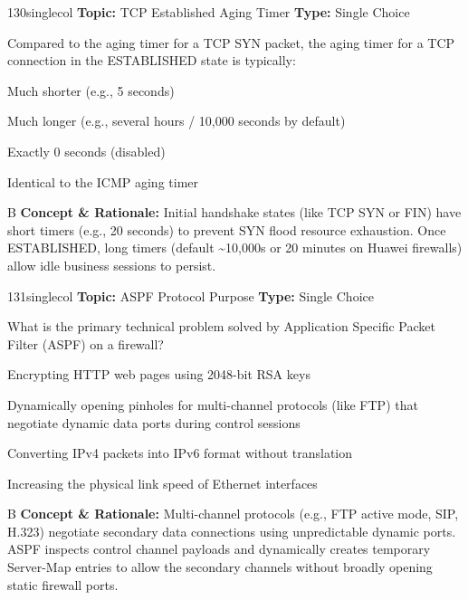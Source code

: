 \begin{qcard}{130}{singlecol}
\textcolor{darkslate!75}{\small\textbf{Topic:} TCP Established Aging Timer \hfill \textbf{Type:} Single Choice}\vspace{0.4em}\par
Compared to the aging timer for a TCP SYN packet, the aging timer for a TCP connection in the ESTABLISHED state is typically:
\begin{qoptions}
\item Much shorter (e.g., 5 seconds)
\item Much longer (e.g., several hours / 10,000 seconds by default)
\item Exactly 0 seconds (disabled)
\item Identical to the ICMP aging timer
\end{qoptions}
\end{qcard}
\nopagebreak
\begin{explainbox}{B}
\textbf{Concept \& Rationale:} Initial handshake states (like TCP SYN or FIN) have short timers (e.g., 20 seconds) to prevent SYN flood resource exhaustion. Once ESTABLISHED, long timers (default \textasciitilde{}10,000s or 20 minutes on Huawei firewalls) allow idle business sessions to persist.
\end{explainbox}

\begin{qcard}{131}{singlecol}
\textcolor{darkslate!75}{\small\textbf{Topic:} ASPF Protocol Purpose \hfill \textbf{Type:} Single Choice}\vspace{0.4em}\par
What is the primary technical problem solved by Application Specific Packet Filter (ASPF) on a firewall?
\begin{qoptions}
\item Encrypting HTTP web pages using 2048-bit RSA keys
\item Dynamically opening pinholes for multi-channel protocols (like FTP) that negotiate dynamic data ports during control sessions
\item Converting IPv4 packets into IPv6 format without translation
\item Increasing the physical link speed of Ethernet interfaces
\end{qoptions}
\end{qcard}
\nopagebreak
\begin{explainbox}{B}
\textbf{Concept \& Rationale:} Multi-channel protocols (e.g., FTP active mode, SIP, H.323) negotiate secondary data connections using unpredictable dynamic ports. ASPF inspects control channel payloads and dynamically creates temporary Server-Map entries to allow the secondary channels without broadly opening static firewall ports.
\end{explainbox}

